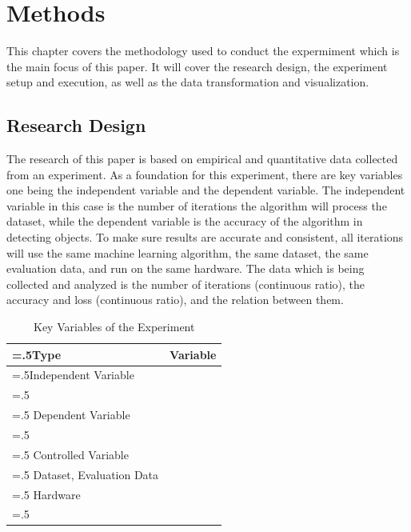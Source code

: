 \section{Methods}
This chapter covers the methodology used to conduct the expermiment which is the main focus of this paper.
It will cover the research design, the experiment setup and execution, as well as the data transformation 
and visualization.

\subsection{Research Design}
The research of this paper is based on empirical and quantitative data collected from an experiment.
As a foundation for this experiment, there are key variables one being the independent variable and the 
dependent variable. The independent variable in this case is the number of iterations the algorithm will
process the dataset, while the dependent variable is the accuracy of the algorithm in detecting objects.
To make sure results are accurate and consistent, all iterations will use the same machine learning algorithm,
the same dataset, the same evaluation data, and run on the same hardware.
The data which is being collected and analyzed is the number of iterations (continuous ratio), the accuracy
and loss (continuous ratio), and the relation between them.

\begin{table}[h]
\centering
\begin{tabularx}{\textwidth}{|>{\hsize=.5\hsize}X|>{\hsize=1.5\hsize}X|}
\hline
\textbf{Type} & \textbf{Variable} \\
\hline
Independent Variable & 
\begin{tabular}{@{}l@{}}
\textbullet{} Number of Iterations  \\
\end{tabular} 
\\
\hline
Dependent Variable & 
\begin{tabular}{@{}l@{}}
\textbullet{} Accuracy of the Model\\
\end{tabular} 
\\
\hline
Controlled Variable & 
\begin{tabular}{@{}l@{}}
\textbullet{} Machine Learning Algorithm \\
\textbullet{} Dataset, Evaluation Data \\
\textbullet{} Hardware \\
\end{tabular} 
\\
\hline
\end{tabularx}
\caption{Key Variables of the Experiment}
\label{table:1}
\end{table}

